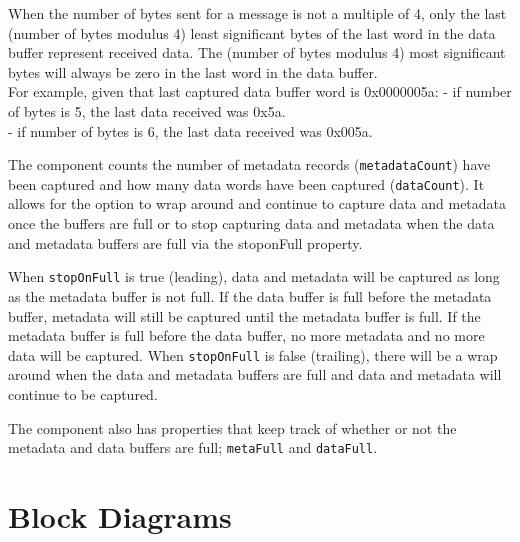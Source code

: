 \begin{flushleft}
When the number of bytes sent for a message is not a multiple of 4, only the
last (number of bytes modulus 4) least significant bytes of the last word
in the data buffer represent received data. The (number of bytes modulus 4)
most significant bytes will always be zero in the last word in the data
buffer. \\
For example, given that last captured data buffer word is 0x0000005a: \newline
- if number of bytes is 5, the last data received was 0x5a. \\
- if number of bytes is 6, the last data received was 0x005a. \newline


The {\comp} component counts the number of metadata records (\texttt{metadataCount}) have been captured and how many data words have been captured (\texttt{dataCount}). It allows for the option to wrap around and continue to capture data and metadata once the buffers are full or to stop capturing data and metadata when the data and metadata buffers are full via the stoponFull property. \newline

When \texttt{stopOnFull} is true (leading), data and metadata will be captured as long as the metadata buffer is not full. If the data buffer is full before the metadata buffer, metadata will still be captured until the metadata buffer is full. If the metadata buffer is full before the data buffer, no more metadata and no more data will be captured. When \texttt{stopOnFull} is false (trailing), there will be a wrap around when the data and metadata buffers are full and data and metadata will continue to be captured.  \newline

The component also has properties that keep track of whether or not the metadata and data buffers are full; \texttt{metaFull} and \texttt{dataFull}. \newline

\end{flushleft}

\section*{Block Diagrams}
